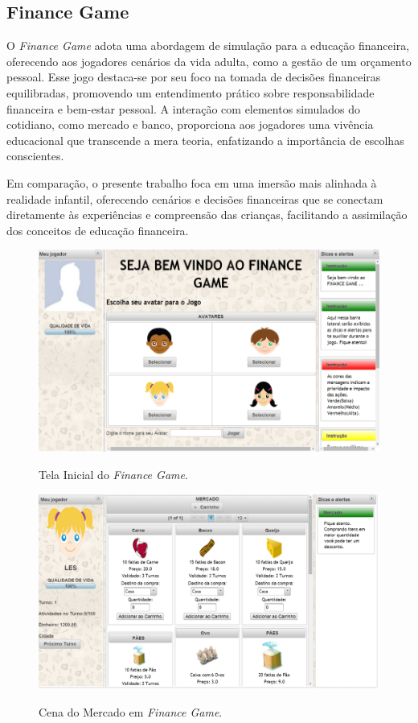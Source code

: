 \subsection{Finance Game}

O \textit{Finance Game} \cite{Finance_Game} adota uma abordagem de simulação para a educação financeira, oferecendo aos jogadores cenários da vida adulta, como a gestão de um orçamento pessoal. Esse jogo destaca-se por seu foco na tomada de decisões financeiras equilibradas, promovendo um entendimento prático sobre responsabilidade financeira e bem-estar pessoal. A interação com elementos simulados do cotidiano, como mercado e banco, proporciona aos jogadores uma vivência educacional que transcende a mera teoria, enfatizando a importância de escolhas conscientes.

Em comparação, o presente trabalho foca em uma imersão mais alinhada à realidade infantil, oferecendo cenários e decisões financeiras que se conectam diretamente às experiências e compreensão das crianças, facilitando a assimilação dos conceitos de educação financeira.

\begin{figure}[ht]
	\centering
	\caption{Tela Inicial do \textit{Finance Game}.}
	\includegraphics[scale=0.6]{Textuais/Pictures/Finance-game-1.png}
	\label{fig:finance-game-1}
\end{figure}

\begin{figure}[ht]
	\centering
	\caption{Cena do Mercado em \textit{Finance Game}.}
	\includegraphics[scale=0.4]{Textuais/Pictures/Finance-game-2.png}
	\label{fig:finance-game-2}
\end{figure}

